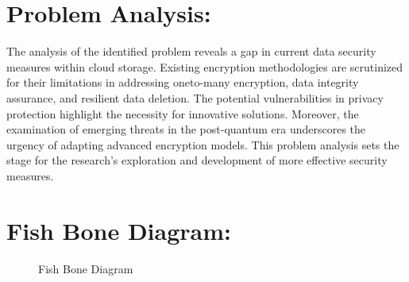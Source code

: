 \section {Problem Analysis: } The analysis of the identified problem reveals a gap in current data security measures within cloud
storage. Existing encryption methodologies are scrutinized for their limitations in addressing oneto-many encryption, data integrity assurance, and resilient data deletion. The potential
vulnerabilities in privacy protection highlight the necessity for innovative solutions. Moreover, the
examination of emerging threats in the post-quantum era underscores the urgency of adapting
advanced encryption models. This problem analysis sets the stage for the research's exploration and
development of more effective security measures. 


\section {Fish Bone Diagram: } 
\begin{figure}[h]
  \centering
  \caption{Fish Bone Diagram}
  
\end{figure}


